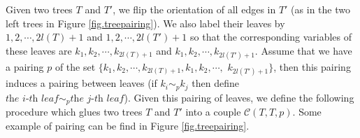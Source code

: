 \begin{defn}\label{def.couple}Given two trees $T$ and $T'$, we flip the orientation of all edges in $T'$ (as in the two left trees in Figure \ref{fig.treepairing}). We also label their leaves by $1, 2, \cdots, 2l(T)+1$ and $1, 2, \cdots, 2l(T')+1$ so that the corresponding variables of these leaves are $k_1, k_2, \cdots, k_{2l(T)+1}$ and $k_1, k_2, \cdots, k_{2l(T')+1}$. Assume that we have a pairing $p$ of the set $\{k_1, k_2, \cdots, k_{2l(T)+1}, k_1, k_2, \cdots,$ $ k_{2l(T')+1}\}$, then this pairing induces a pairing between leaves (if $k_i\sim_p k_j$ then define $\textit{the $i$-th leaf}\sim_p \textit{the $j$-th leaf}$). Given this pairing of leaves, we define the following procedure which glues two trees $T$ and $T'$ into a couple  $\mathcal{C}(T,T,p)$. Some example of pairing can be find in Figure \ref{fig.treepairing}. 


\end{defn}
